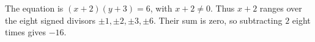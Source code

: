 The equation is $(x+2)(y+3)=6$, with $x+2\ne0$. Thus $x+2$ ranges over the eight signed divisors $\pm1,\pm2,\pm3,\pm6$. Their sum is zero, so subtracting $2$ eight times gives $\boxed{-16}$.
